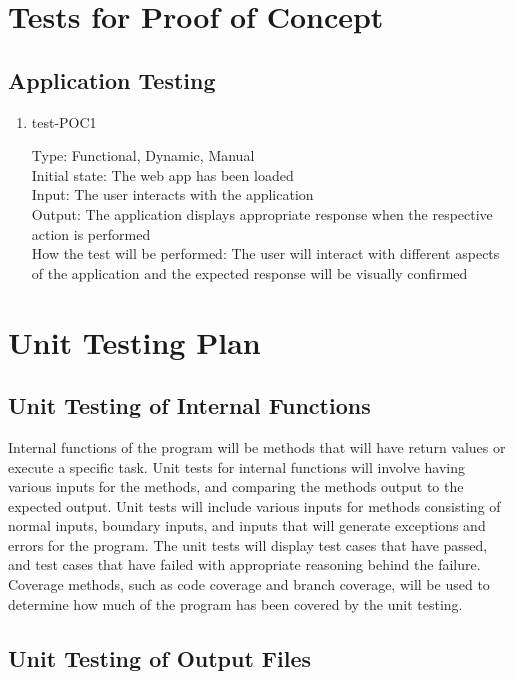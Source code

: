 \documentclass[12pt, titlepage]{article}
\begin{document}
\section{Tests for Proof of Concept}

\subsection{Application Testing}

\begin{enumerate}
\item{test-POC1\\}

Type: Functional, Dynamic, Manual\\
Initial state: The web app has been loaded\\
Input: The user interacts with the application\\
Output: The application displays appropriate response when the respective action is performed\\
How the test will be performed: The user will interact with different aspects of the application and the expected response will be visually confirmed
\end{enumerate}

\section{Unit Testing Plan}

\subsection{Unit Testing of Internal Functions}

Internal functions of the program will be methods that will have return values or execute a specific task. Unit tests for internal functions will involve having various inputs for the methods, and comparing the methods output to the expected output. Unit tests will include various inputs for methods consisting of normal inputs, boundary inputs, and inputs that will generate exceptions and errors for the program. The unit tests will display test cases that have passed, and test cases that have failed with appropriate reasoning behind the failure. Coverage methods, such as code coverage and branch coverage, will be used to determine how much of the program has been covered by the unit testing.

\subsection{Unit Testing of Output Files}
\end{document}
